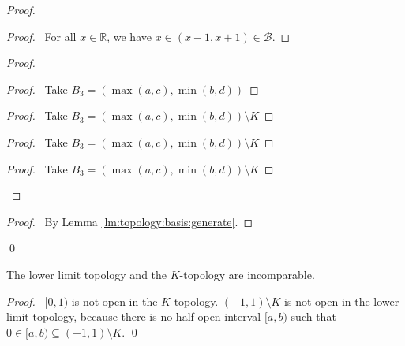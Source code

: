 \begin{proof}
  \pf
  \begin{proof}
    \pf\ For all $x \in \mathbb{R}$, we have $x \in (x-1, x+1) \in
    \mathcal{B}$.
  \end{proof}
  \begin{proof}
    \begin{proof}
      \pf\ Take $B_3 = (\max(a,c), \min(b,d))$
    \end{proof}
    \begin{proof}
      \pf\ Take $B_3 = (\max(a,c), \min(b,d)) \setminus K$
    \end{proof}
    \begin{proof}
      \pf\ Take $B_3 = (\max(a,c), \min(b,d)) \setminus K$
    \end{proof}
    \begin{proof}
      \pf\ Take $B_3 = (\max(a,c), \min(b,d)) \setminus K$
    \end{proof}
  \end{proof}
  \qedstep
  \begin{proof}
    \pf\ By Lemma \ref{lm:topology:basis:generate}.
  \end{proof}
  \qed
\end{proof}

\begin{lm}
  The lower limit topology and the $K$-topology are incomparable.
\end{lm}

\begin{proof}
  \pf\ $[0, 1)$ is not open in the $K$-topology. $(-1, 1) \setminus K$ is not
  open in the lower limit topology, because there is no half-open interval
  $[a,
  b)$ such that $0 \in [a,b) \subseteq (-1, 1) \setminus K$. \qed
\end{proof}

